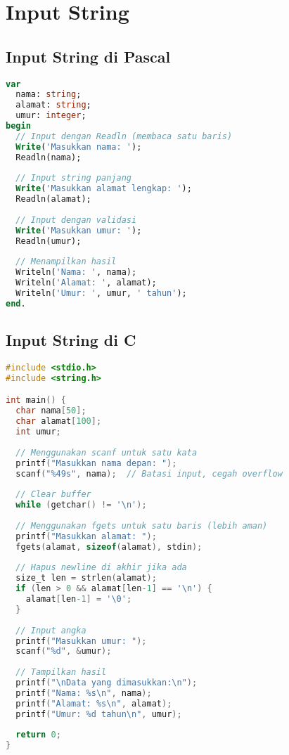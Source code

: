 \documentclass[../main.tex]{subfiles}
\begin{document}
\section{Input String}

\subsection{Input String di Pascal}

\begin{lstlisting}[language=Pascal, caption={Input string di Pascal}]
var
  nama: string;
  alamat: string;
  umur: integer;
begin
  // Input dengan Readln (membaca satu baris)
  Write('Masukkan nama: ');
  Readln(nama);
  
  // Input string panjang
  Write('Masukkan alamat lengkap: ');
  Readln(alamat);
  
  // Input dengan validasi
  Write('Masukkan umur: ');
  Readln(umur);
  
  // Menampilkan hasil
  Writeln('Nama: ', nama);
  Writeln('Alamat: ', alamat);
  Writeln('Umur: ', umur, ' tahun');
end.
\end{lstlisting}

\subsection{Input String di C}

\begin{lstlisting}[language=C, caption={Input string di C}]
#include <stdio.h>
#include <string.h>

int main() {
  char nama[50];
  char alamat[100];
  int umur;
  
  // Menggunakan scanf untuk satu kata
  printf("Masukkan nama depan: ");
  scanf("%49s", nama);  // Batasi input, cegah overflow
  
  // Clear buffer
  while (getchar() != '\n');
  
  // Menggunakan fgets untuk satu baris (lebih aman)
  printf("Masukkan alamat: ");
  fgets(alamat, sizeof(alamat), stdin);
  
  // Hapus newline di akhir jika ada
  size_t len = strlen(alamat);
  if (len > 0 && alamat[len-1] == '\n') {
    alamat[len-1] = '\0';
  }
  
  // Input angka
  printf("Masukkan umur: ");
  scanf("%d", &umur);
  
  // Tampilkan hasil
  printf("\nData yang dimasukkan:\n");
  printf("Nama: %s\n", nama);
  printf("Alamat: %s\n", alamat);
  printf("Umur: %d tahun\n", umur);
  
  return 0;
}
\end{lstlisting}
\end{document}
